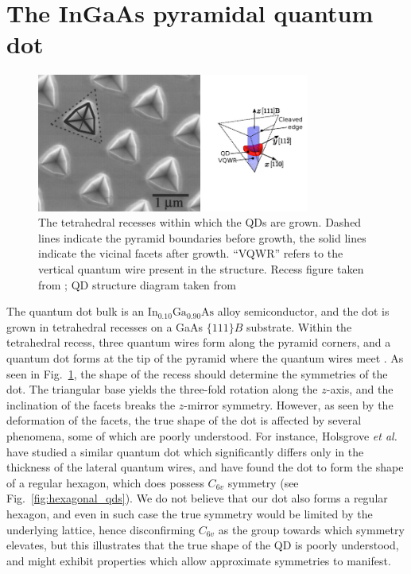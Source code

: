 \documentclass[12pt]{report}
\begin{document}
\section{The InGaAs pyramidal quantum dot} \label{sec:growth}
\begin{figure}
\begin{center}

    \includegraphics[width=0.8\textwidth]{figures/pyramidal_qds}
 \caption{The tetrahedral recesses within which the QDs are grown. Dashed lines indicate the pyramid boundaries before growth, the solid lines indicate the vicinal facets after growth. ``VQWR'' refers to the vertical quantum wire present in the structure. Recess figure taken from \cite[Fig.~1]{pyramidal_qds}; QD structure diagram taken from \cite[Fig.~1]{karlsson}\label{fig:pyramidal_qds}}
\end{center}
\end{figure}

The quantum dot bulk is an $\text{In}_{0.10}\text{Ga}_{0.90}\text{As}$ alloy semiconductor, and the dot is grown in tetrahedral recesses on a GaAs $\{111\}B$ substrate. Within the tetrahedral recess, three quantum wires form along the pyramid corners, and a quantum dot forms at the tip of the pyramid where the quantum wires meet \cite{pyramidal_qds}. As seen in Fig.~\ref{fig:pyramidal_qds}, the shape of the recess should determine the symmetries of the dot. The triangular base yields the three-fold rotation along the $z$-axis, and the inclination of the facets breaks the $z$-mirror symmetry. However, as seen by the deformation of the facets, the true shape of the dot is affected by several phenomena, some of which are poorly understood. For instance, Holsgrove \textit{et al.} have studied a similar quantum dot which significantly differs only in the thickness of the lateral quantum wires, and have found the dot to form the shape of a regular hexagon, which does possess $C_{6v}$ symmetry \cite{hexagon} (see Fig.~\ref{fig:hexagonal_qds}). We do not believe that our dot also forms a regular hexagon, and even in such case the true symmetry would be limited by the underlying lattice, hence disconfirming $C_{6v}$ as the group towards which symmetry elevates, but this illustrates that the true shape of the QD is poorly understood, and might exhibit properties which allow approximate symmetries to manifest.
\end{document}
